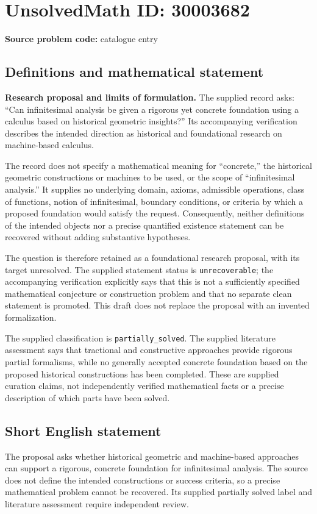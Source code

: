 \documentclass[11pt]{article}
\begin{document}
\section*{UnsolvedMath ID: 30003682}
\textbf{Source problem code:} catalogue entry
\subsection{Definitions and mathematical statement}
\textbf{Research proposal and limits of formulation.} The supplied record asks: ``Can infinitesimal analysis be given a rigorous yet concrete foundation using a calculus based on historical geometric insights?'' Its accompanying verification describes the intended direction as historical and foundational research on machine-based calculus.

The record does not specify a mathematical meaning for ``concrete,'' the historical geometric constructions or machines to be used, or the scope of ``infinitesimal analysis.'' It supplies no underlying domain, axioms, admissible operations, class of functions, notion of infinitesimal, boundary conditions, or criteria by which a proposed foundation would satisfy the request. Consequently, neither definitions of the intended objects nor a precise quantified existence statement can be recovered without adding substantive hypotheses.

The question is therefore retained as a foundational research proposal, with its target unresolved. The supplied statement status is \texttt{unrecoverable}; the accompanying verification explicitly says that this is not a sufficiently specified mathematical conjecture or construction problem and that no separate clean statement is promoted. This draft does not replace the proposal with an invented formalization.

The supplied classification is \texttt{partially\_solved}. The supplied literature assessment says that tractional and constructive approaches provide rigorous partial formalisms, while no generally accepted concrete foundation based on the proposed historical constructions has been completed. These are supplied curation claims, not independently verified mathematical facts or a precise description of which parts have been solved.
\subsection{Short English statement}
The proposal asks whether historical geometric and machine-based approaches can support a rigorous, concrete foundation for infinitesimal analysis. The source does not define the intended constructions or success criteria, so a precise mathematical problem cannot be recovered. Its supplied partially solved label and literature assessment require independent review.
\end{document}
